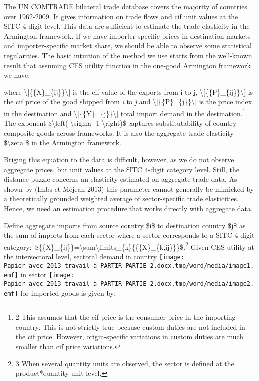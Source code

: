 \documentclass[12pt,twoside,a4paper,notitlepage]{article}
\begin{document}
The UN COMTRADE bilateral trade database covers the majority of countries over 1962-2009. It gives information on trade flows and cif unit values at the SITC 4-digit level. This data are sufficient to estimate the trade elasticity in the Armington framework. If we have importer-specific prices in destination markets and importer-specific market share, we should be able to observe some statistical regularities. The basic intuition of the method we use starts from the well-known result that assuming CES utility function in the one-good Armington framework we have:

\raisebox{-18pt}{\textbackslash [\{\{X\}\_\{ij\}\}=\{\{\textbackslash left( \textbackslash frac\{\{\{P\}\_\{ij\}\}\}\{\{\{P\}\_\{j\}\}\} \textbackslash right)\}\textasciicircum{}\{-(\textbackslash sigma -1)\}\}\{\{Y\}\_\{j\}\}\textbackslash ]}

where \textbackslash [\{\{X\}\_\{ij\}\}\textbackslash ] is the cif value of the exports from i to j, \textbackslash [\{\{P\}\_\{ij\}\}\textbackslash ] is the cif price of the good shipped from \textit{i} to \textit{j} and \textbackslash [\{\{P\}\_\{j\}\}\textbackslash ] is the price index in the destination and \textbackslash [\{\{Y\}\_\{j\}\}\textbackslash ] total import demand in the destination.\footnote{2 This assumes that the cif price is the consumer price in the importing country. This is not strictly true because custom duties are not included in the cif price. However, origin-specific variations in custom duties are much smaller than cif price variations.
} The exponent \$\textbackslash left( \textbackslash sigma -1 \textbackslash right)\$ captures substitutability of country-composite goods across frameworks. It is also the aggregate trade elasticity \$\textbackslash zeta \$ in the Armington framework.

Briging this equation to the data is difficult, however, as we do not observe aggregate prices, but unit values at the SITC 4-digit category level. Still, the distance puzzle concerns an elasticity estimated on aggregate trade data. As shown by (Imbs et M\'{e}jean 2013) this parameter cannot generally be mimicked by a theoretically grounded weighted average of sector-specific trade elasticities. Hence, we need an estimation procedure that works directly with aggregate data.

Define aggregate imports from source country \$i\$ to destination country \$j\$ as the sum of imports from each sector \raisebox{-2pt}{\$k\$} where a sector corresponds to a SITC 4-digit category:~\$\{\{X\}\_\{ij\}\}=\textbackslash sum\textbackslash limits\_\{k\}\{\{\{X\}\_\{k,ij\}\}\}\$.\footnote{3 When several quantity units are observed, the sector is defined at the product*quantity-unit level.
} Given CES utility at the intersectoral level, sectoral demand in country \texttt{[image: Papier\_avec\_2013\_travail\_à\_PARTIR\_PARTIE\_2.docx.tmp/word/media/image1.emf]} in sector \texttt{[image: Papier\_avec\_2013\_travail\_à\_PARTIR\_PARTIE\_2.docx.tmp/word/media/image2.emf]} for imported goods is given by: 
\end{document}
